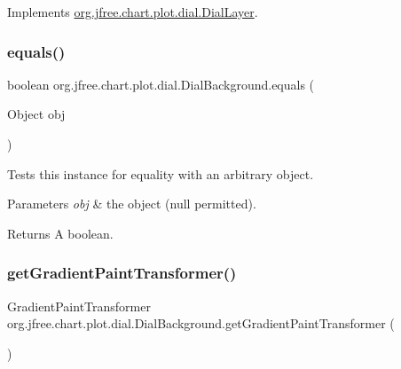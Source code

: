 Implements \mbox{\hyperlink{interfaceorg_1_1jfree_1_1chart_1_1plot_1_1dial_1_1_dial_layer_aa4564e018317f0fdc7dbe85a46e7a4a4}{org.\+jfree.\+chart.\+plot.\+dial.\+Dial\+Layer}}.

\mbox{\label{classorg_1_1jfree_1_1chart_1_1plot_1_1dial_1_1_dial_background_ab474c79eeb00ee3b42f57ed7b6563af2}} 
\subsubsection{\texorpdfstring{equals()}{equals()}}
{\footnotesize\ttfamily boolean org.\+jfree.\+chart.\+plot.\+dial.\+Dial\+Background.\+equals (\begin{DoxyParamCaption}\item[{Object}]{obj }\end{DoxyParamCaption})}

Tests this instance for equality with an arbitrary object.


\begin{DoxyParams}{Parameters}
{\em obj} & the object ({\ttfamily null} permitted).\\
\hline
\end{DoxyParams}
\begin{DoxyReturn}{Returns}
A boolean. 
\end{DoxyReturn}
\mbox{\label{classorg_1_1jfree_1_1chart_1_1plot_1_1dial_1_1_dial_background_ade7f0d760e45a220a3bbcdf87a983385}} 
\subsubsection{\texorpdfstring{get\+Gradient\+Paint\+Transformer()}{getGradientPaintTransformer()}}
{\footnotesize\ttfamily Gradient\+Paint\+Transformer org.\+jfree.\+chart.\+plot.\+dial.\+Dial\+Background.\+get\+Gradient\+Paint\+Transformer (\begin{DoxyParamCaption}{ }\end{DoxyParamCaption})}

